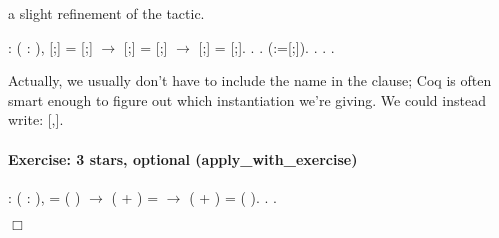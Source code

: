 \documentclass[12pt]{report}
\begin{document}
    a slight refinement of the  tactic. \begin{coqdoccode}
\coqdocemptyline
\coqdocnoindent
{}  : \coqdockw{\ensuremath{\forall}} (      : ),\coqdoceol
\coqdocindent{2.50em}
[;] = [;] \ensuremath{\rightarrow}\coqdoceol
\coqdocindent{2.50em}
[;] = [;] \ensuremath{\rightarrow}\coqdoceol
\coqdocindent{2.50em}
[;] = [;].\coqdoceol
\coqdocnoindent
{}.\coqdoceol
\coqdocindent{1.00em}
        .\coqdoceol
\coqdocindent{1.00em}
   (:=[;]).  .  . .\coqdoceol
\coqdocemptyline
\end{coqdoccode}
 Actually, we usually don't have to include the name 
    in the  clause; Coq is often smart enough to
    figure out which instantiation we're giving. We could
    instead write:    [,]. 

\paragraph{Exercise: 3 stars, optional (apply\_with\_exercise)}

\begin{coqdoccode}
\coqdocnoindent
{}  : \coqdockw{\ensuremath{\forall}} (    : ),\coqdoceol
\coqdocindent{2.50em}
 = ( ) \ensuremath{\rightarrow}\coqdoceol
\coqdocindent{2.50em}
( + ) =  \ensuremath{\rightarrow}\coqdoceol
\coqdocindent{2.50em}
( + ) = ( ).\coqdoceol
\coqdocnoindent
{}.\coqdoceol
 .\coqdoceol
\end{coqdoccode}
\ensuremath{\Box} \begin{coqdoccode}
\coqdocemptyline
\end{coqdoccode}
\end{document}
